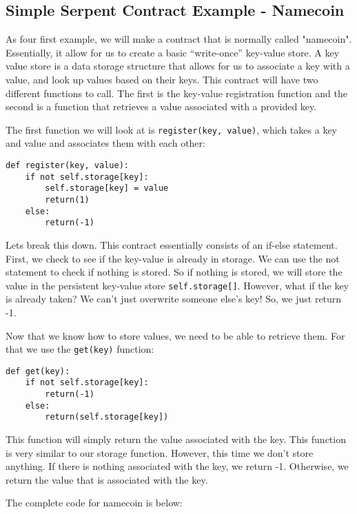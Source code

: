 \documentclass[12pt]{article}
\begin{document}
\subsection{Simple Serpent Contract Example - Namecoin}
As four first example, we will make a contract that is normally called "namecoin". Essentially, it allow for us to create a basic ``write-once'' key-value store. A key value store is a data storage structure that allows for us to associate a key with a value, and look up values based on their keys. This contract will have two different functions to call. The first is the key-value registration function and the second is a function that retrieves a value associated with a provided key.

The first function we will look at is \texttt{register(key, value)}, which takes a key and value and associates them with each other:

\begin{verbatim}
def register(key, value):
	if not self.storage[key]:
		self.storage[key] = value
		return(1)
	else:
		return(-1)
\end{verbatim}

Lets break this down. This contract essentially consists of an if-else statement. First, we check to see if the key-value is already in storage. We can use the not statement to check if nothing is stored. So if nothing is stored, we will store the value in the persistent key-value store \texttt{self.storage[]}. However, what if the key is already taken? We can't just overwrite someone else's key! So, we just return -1. 

Now that we know how to store values, we need to be able to retrieve them. For that we use the \texttt{get(key)} function:

\begin{verbatim}
def get(key):
	if not self.storage[key]:
		return(-1)
	else:
		return(self.storage[key])
\end{verbatim}

This function will simply return the value associated with the key. This function is very similar to our storage function. However, this time we don't store anything. If there is nothing associated with the key, we return -1. Otherwise, we return the value that is associated with the key.

The complete code for namecoin is below:
\end{document}
